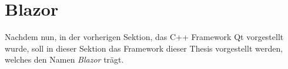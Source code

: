 \section{Blazor}
\label{sec:blazor}
Nachdem nun, in der vorherigen Sektion, das C++ Framework Qt vorgestellt wurde, soll in dieser
Sektion das Framework dieser Thesis vorgestellt werden, welches den Namen \emph{Blazor} trägt.




